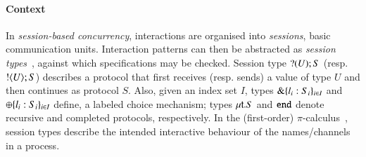 \documentclass[runningheads]{llncs}
\begin{document}
\paragraph{Context}
In \emph{session-based concurrency}, interactions are organised into \emph{sessions}, basic communication units.
Interaction patterns can then be abstracted as \emph{session types}~\cite{honda.vasconcelos.kubo:language-primitives}, against which  specifications may be checked. 
Session type $? (U) ; S$ (resp.  $! \langle U \rangle ; S$)
describes a protocol that first receives (resp. sends) a value of type $U$ and then continues as protocol $S$.
Also, given an index set $I$, types $\& \{l_i:S_i\}_{i \in I}$ 
and $\oplus \{l_i:S_i\}_{i \in I}$ 
define, %
 a labeled choice mechanism; types 
$\mu\mathsf{t}.S$ 
and 
$\mathtt{end}$ denote recursive and completed protocols, respectively.
In the (first-order) $\pi$-calculus~\cite{MilnerR:calmp1}, 
session types describe the intended interactive behaviour of the names/channels in a process.
\end{document}
